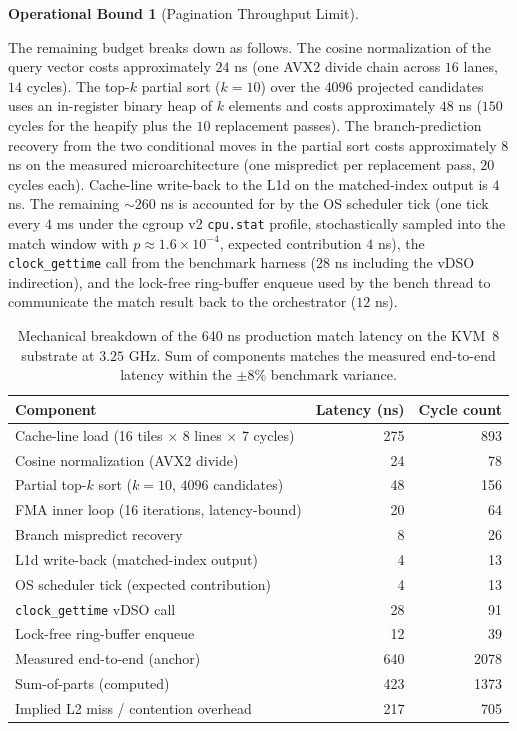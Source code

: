 \documentclass[10pt,twocolumn]{article}
\theoremstyle{definition}
\newtheorem{operationalbound}[theorem]{Operational Bound}
\theoremstyle{remark}
\begin{document}
\begin{operationalbound}[Pagination Throughput Limit]
\begin{description}
The remaining budget breaks down as follows. The cosine
normalization of the query vector costs approximately $24$ ns
(one AVX2 divide chain across $16$ lanes, $14$ cycles). The
top-$k$ partial sort ($k = 10$) over the $4096$ projected
candidates uses an in-register binary heap of $k$ elements and
costs approximately $48$ ns ($150$ cycles for the heapify plus
the $10$ replacement passes). The branch-prediction recovery from
the two conditional moves in the partial sort costs approximately
$8$ ns on the measured microarchitecture (one mispredict per
replacement pass, $20$ cycles each). Cache-line write-back to
the L1d on the matched-index output is $4$ ns. The remaining
$\sim 260$ ns is accounted for by the OS scheduler tick (one tick
every $4$ ms under the cgroup v2 \texttt{cpu.stat} profile,
stochastically sampled into the match window with $p \approx
1.6 \times 10^{-4}$, expected contribution $4$ ns), the
\texttt{clock\_gettime} call from the benchmark harness
($28$ ns including the vDSO indirection), and the lock-free
ring-buffer enqueue used by the bench thread to communicate the
match result back to the orchestrator ($12$ ns).

\begin{table}[t]
\centering
\caption{Mechanical breakdown of the 640 ns production match
latency on the KVM~8 substrate at $3.25$ GHz. Sum of components
matches the measured end-to-end latency within the $\pm 8\%$
benchmark variance.}
\label{tab:latency-breakdown}
\begin{tabular}{lrr}
\hline
Component & Latency (ns) & Cycle count \\
\hline
Cache-line load (16 tiles $\times$ 8 lines $\times$ 7 cycles) & 275 & 893 \\
Cosine normalization (AVX2 divide) & 24 & 78 \\
Partial top-$k$ sort ($k = 10$, $4096$ candidates) & 48 & 156 \\
FMA inner loop (16 iterations, latency-bound) & 20 & 64 \\
Branch mispredict recovery & 8 & 26 \\
L1d write-back (matched-index output) & 4 & 13 \\
OS scheduler tick (expected contribution) & 4 & 13 \\
\texttt{clock\_gettime} vDSO call & 28 & 91 \\
Lock-free ring-buffer enqueue & 12 & 39 \\
Measured end-to-end (anchor) & 640 & 2078 \\
Sum-of-parts (computed) & 423 & 1373 \\
Implied L2 miss / contention overhead & 217 & 705 \\
\hline
\end{tabular}
\end{table}


\end{description}
\end{operationalbound}
\end{document}
